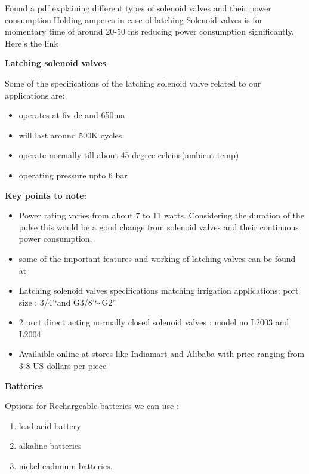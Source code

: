 \documentclass[16pt]{article}
\begin{document}
  Found a pdf explaining different types of solenoid valves and their
  power consumption.Holding amperes in case of latching Solenoid valves is
  for momentary time of around 20-50 ms reducing power consumption
  significantly. Here's the link

\hfill

{\textbf{\Large{Latching solenoid valves}}}

\hfill

  Some of the specifications of the latching solenoid valve related to our
  applications are:
  
  \begin{itemize}

  \item
    operates at 6v dc and 650ma
  \item
    will last around 500K cycles
  \item
    operate normally till about 45 degree celcius(ambient temp)
  \item
    operating pressure upto 6 bar
  \end{itemize}
  


  \textbf{Key points to note:}

  \begin{itemize}

  \item
    Power rating varies from about 7 to 11 watts. Considering the duration
    of the pulse this would be a good change from solenoid valves and
    their continuous power consumption.
  \item
    some of the important features and working of latching valves can be
    found at
    
  \item
    Latching solenoid valves specifications matching irrigation
    applications: port size : 3/4'`and G3/8'`\textasciitilde{}G2''
  \item
    2 port direct acting normally closed solenoid valves : model no L2003
    and L2004
  \item
    Availaible online at stores like Indiamart and Alibaba with price
    ranging from 3-8 US dollars per piece
  \end{itemize}

\hfill

{\textbf{\Large{Batteries}}}

\hfill

Options for Rechargeable batteries we can use :
\hfill
\begin{enumerate}

\item
  lead acid battery
\item
  alkaline batteries
\item
  nickel-cadmium batteries.
\end{enumerate}
\end{document}
